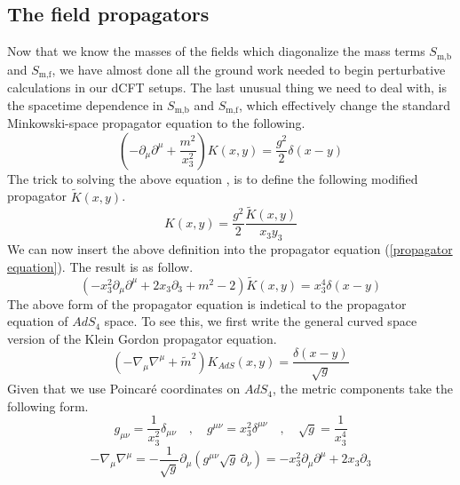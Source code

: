 \subsection{The field propagators}\label{sec:field propagators}
Now that we know the masses of the fields which diagonalize the mass terms $S_{\text{m,b}}$ and $S_{\text{m,f}}$, we have almost done all the ground work needed to begin perturbative calculations in our dCFT setups. The last unusual thing we need to deal with, is the spacetime dependence in $S_{\text{m,b}}$ and $S_{\text{m,f}}$, which effectively change the standard Minkowski-space propagator equation to the following.
%
%
\begin{equation}\label{propagator equation}
\left(
-\partial_\mu \partial^\mu + \frac{m^2}{x_3^2}
\right)
K(x,y)
=
\frac{g^2}{2} \delta(x-y)
\end{equation}
%
%
The trick to solving the above equation \cite{One-point functions in D5-D3}, is to define the following modified propagator $\tilde{K}(x,y)$.
%
%
\begin{equation}
K(x,y) = \frac{g^2}{2} \frac{\tilde{K}(x,y)}{x_3 y_3}
\end{equation}
%
%
We can now insert the above definition into the propagator equation (\ref{propagator equation}). The result is as follow.
%
%
\begin{equation}\label{modified propagator equation}
\left(
-x_3^2 \partial_\mu \partial^\mu + 2 x_3 \partial_3 + m^2 - 2
\right)
\tilde{K}(x,y)
=
x_3^4 \delta(x-y)
\end{equation}
%
%
The above form of the propagator equation is indetical to the propagator equation of $AdS_4$ space. To see this, we first write the general curved space version of the Klein Gordon propagator equation.
%
%
\begin{equation}\label{curved space propagator equation}
\left(
- \nabla_\mu \nabla^\mu + \tilde{m}^2
\right)
K_{AdS}(x,y)
=
\frac{\delta(x-y)}{\sqrt{g}}
\end{equation}
%
%
Given that we use Poincar\'{e} coordinates on $AdS_4$, the metric components take the following form.
%
%
\begin{equation}
g_{\mu\nu} = \frac{1}{x_3^2} \delta_{\mu\nu}
%
\quad , \quad
%
g^{\mu\nu} = x_3^2 \delta^{\mu\nu}
%
\quad , \quad
%
\sqrt{g} = \frac{1}{x_3^4}
\end{equation}
%
%
\begin{equation}
-\nabla_\mu \nabla^\mu
=
-\frac{1}{\sqrt{g}} \partial_\mu \left( g^{\mu\nu} \sqrt{g} \, \partial_\nu \right)
=
-x_3^2 \partial_\mu \partial^\mu + 2 x_3 \partial_3
\end{equation}
